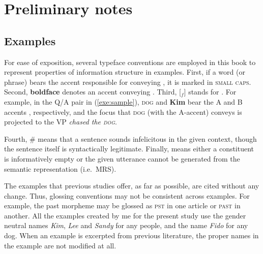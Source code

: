 \chapter{Preliminary notes}
\label{2:notes}
\setcounter{enums}{0}



\section{Examples}
\label{1:sec:examples}


For ease of exposition, several typeface conventions are employed in
this book to represent properties of information structure in
examples. First, if a word (or phrase) bears the accent responsible
for conveying , it is marked in \textsc{small
  caps}. Second, \textbf{boldface} denotes an accent conveying
.  Third, [$_{f}$] stands for . For
example, in the  Q/A pair in (\ref{exe:sample}),
\textsc{dog} and \textbf{Kim} bear the A and B accents
\citep{jackendoff:72}, respectively, and the focus that \textsc{dog}
(with the A-accent) conveys is projected to the VP \textit{chased the
  \textsc{dog}}.


\noindent Fourth, \# means that a sentence sounds infelicitous in the
given context, though the sentence itself is syntactically
legitimate. Finally,  means either a constituent is
informatively empty or the given utterance cannot be generated from
the semantic representation (i.e.\ MRS).


The examples that previous studies offer, as far as possible, are
cited without any change. Thus, glossing conventions may not be
consistent across examples. For example, the past morpheme may be
glossed as \textsc{pst} in one article or \textsc{past} in another.
All the examples created by me for the present study use the gender
neutral names \textit{Kim}, \textit{Lee} and \textit{Sandy} for any
people, and the name \textit{Fido} for any dog.  When an example is
excerpted from previous literature, the proper names in the example
are not modified at all.


